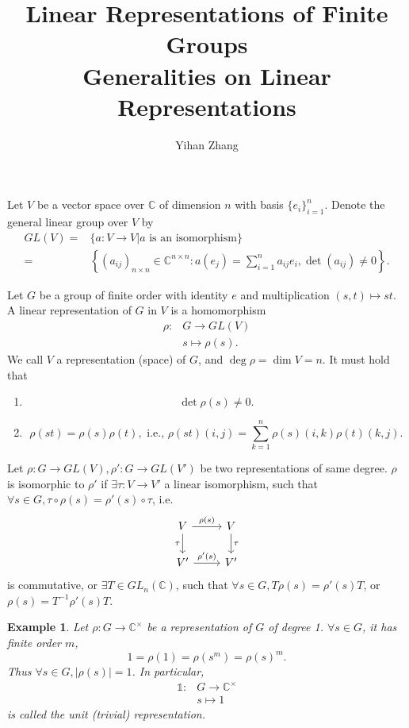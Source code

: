 \documentclass[12pt]{article}
\newtheorem{example}{Example}
\begin{document}
\title{Linear Representations of Finite Groups\\Generalities on Linear Representations}
\author{Yihan Zhang}
\maketitle

\bigskip

Let $V$ be a vector space over $\mathbb C$ of dimension $n$ with basis $\{e_i\}_{i=1}^n$. Denote the general linear group over $V$ by 
\begin{align*}
GL(V)=&\{a:V\to V|a\text{ is an isomorphism}\}\\
=&\left\{(a_{ij})_{n\times n}\in\mathbb C^{n\times n}:a(e_j)=\sum_{i=1}^na_{ij}e_i,\det(a_{ij})\ne 0\right\}.
\end{align*}

Let $G$ be a group of finite order with identity $e$ and multiplication $(s,t)\mapsto st$. A linear representation of $G$ in $V$ is a homomorphism
\begin{align*}
\rho:&G\to GL(V)\\
&s\mapsto \rho(s).
\end{align*}
We call $V$ a representation (space) of $G$, and $\deg\rho=\dim V=n$. It must hold that 
\begin{enumerate}
	\item \[\det\rho(s)\ne0.\]
	\item \[\rho(st)=\rho(s)\rho(t),\text{ i.e., }\rho(st)(i,j)=\sum_{k=1}^n\rho(s)(i,k)\rho(t)(k,j).\]
\end{enumerate}

Let $\rho:G\to GL(V),\rho':G\to GL(V')$ be two representations of same degree. $\rho$ is isomorphic to $\rho'$ if $\exists \tau:V\to V'$ a linear isomorphism, such that $\forall s\in G, \tau\circ \rho(s)=\rho'(s)\circ\tau$, i.e.
\[\begin{tikzcd}
V \arrow{r}{\rho(s)} \arrow[swap]{d}{\tau} & V \arrow{d}{\tau} \\%
V' \arrow{r}{\rho'(s)}& V'
\end{tikzcd}\]
is commutative, or $\exists T\in GL_n(\mathbb C)$, such that $\forall s\in G,T\rho(s)=\rho'(s)T$, or $\rho(s)=T^{-1}\rho'(s)T$.

\begin{example}
Let $\rho:G\to\mathbb C^{\times}$ be a representation of $G$ of degree 1. $\forall s\in G$, it has finite order $m$,
\[1=\rho(1)=\rho(s^m)=\rho(s)^m.\]
Thus $\forall s\in G,|\rho(s)|=1$. In particular, 
\begin{align*}
\mathds1:&G\to\mathbb C^{\times}\\
&s\mapsto1
\end{align*}
is called the unit (trivial) representation.
\end{example}
\end{document}
